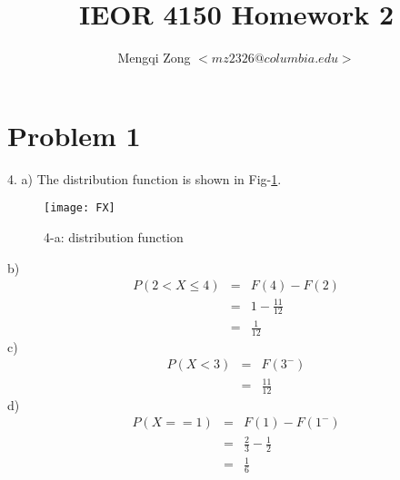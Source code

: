 \documentclass[12pt]{article}
\title{IEOR 4150 Homework 2}
\author{Mengqi Zong $<mz2326@columbia.edu>$}
\begin{document}
\maketitle

\setlength{\parindent}{0in}

\section*{Problem 1}
4.
a) The distribution function is shown in Fig-\ref{fig:FX}. \\

\begin{figure}[ht!]
  \centering
  \texttt{[image: FX]}
  \caption{4-a: distribution function \label{fig:FX}}
\end{figure}

b)
\begin{eqnarray*}
  P(2 < X \le 4)
  &=& F(4) - F(2) \\
  &=& 1 - \frac {11}{12} \\
  &=& \frac {1}{12}
\end{eqnarray*}
c)
\begin{eqnarray*}
  P(X < 3)
  &=& F(3^-) \\
  &=& \frac {11}{12}
\end{eqnarray*}
d)
\begin{eqnarray*}
  P(X == 1)
  &=& F(1) - F(1^-) \\
  &=& \frac {2}{3} - \frac {1}{2} \\
  &=& \frac {1}{6}
\end{eqnarray*}
\end{document}
